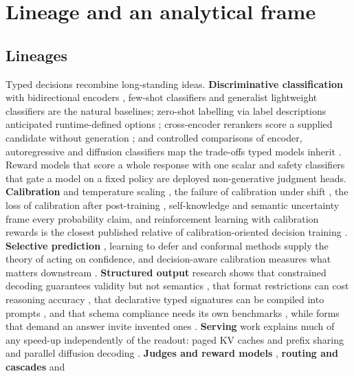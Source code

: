 \section{Lineage and an analytical frame}\label{sec:lineage-and-an-analytical-frame}

\subsection{Lineages}

Typed decisions recombine long-standing ideas. \textbf{Discriminative classification} with bidirectional encoders \citep{arxiv1810_04805,arxiv2412_13663}, few-shot classifiers \citep{arxiv2209_11055} and generalist lightweight classifiers \citep{arxiv2508_07662,arxiv2311_08526} are the natural baselines; zero-shot labelling via label descriptions anticipated runtime-defined options \citep{arxiv1909_00161}; cross-encoder rerankers score a supplied candidate without generation \citep{arxiv1901_04085}; and controlled comparisons of encoder, autoregressive and diffusion classifiers map the trade-offs typed models inherit \citep{arxiv2506_12181}. Reward models that score a whole response with one scalar \citep{arxiv2203_02155} and safety classifiers that gate a model on a fixed policy \citep{arxiv2312_06674,arxiv2501_18837} are deployed non-generative judgment heads. \textbf{Calibration} and temperature scaling \citep{arxiv1706_04599}, the failure of calibration under shift \citep{arxiv1906_02530}, the loss of calibration after post-training \citep{arxiv2303_08774}, self-knowledge \citep{arxiv2207_05221} and semantic uncertainty \citep{arxiv2302_09664} frame every probability claim, and reinforcement learning with calibration rewards is the closest published relative of calibration-oriented decision training \citep{arxiv2507_16806,arxiv2503_02623,arxiv2601_13284}. \textbf{Selective prediction} \citep{arxiv1705_08500,arxiv1901_09192}, learning to defer \citep{arxiv2006_01862} and conformal methods \citep{arxiv2107_07511,arxiv2310_05921} supply the theory of acting on confidence, and decision-aware calibration measures what matters downstream \citep{arxiv2404_13503,arxiv2504_15582,arxiv2511_13699,arxiv2510_07750}. \textbf{Structured output} research shows that constrained decoding guarantees validity but not semantics \citep{arxiv2109_05093,arxiv2307_09702,arxiv2411_15100}, that format restrictions can cost reasoning accuracy \citep{arxiv2408_02442}, that declarative typed signatures can be compiled into prompts \citep{arxiv2310_03714}, and that schema compliance needs its own benchmarks \citep{arxiv2501_10868,arxiv2604_25359}, while forms that demand an answer invite invented ones \citep{arxiv2607_20492}. \textbf{Serving} work explains much of any speed-up independently of the readout: paged KV caches and prefix sharing \citep{arxiv2309_06180,arxiv2312_07104} and parallel diffusion decoding \citep{arxiv2502_09992,arxiv2506_17298}. \textbf{Judges and reward models} \citep{arxiv2306_05685,arxiv2310_08491,arxiv2403_13787}, \textbf{routing and cascades} \citep{arxiv2305_05176,arxiv2406_18665,arxiv2601_07206,arxiv2510_01237} and 